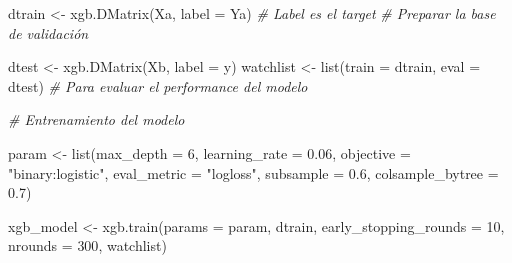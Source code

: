 \documentclass[
]{article}
\newenvironment{Shaded}{\begin{snugshade}}{\end{snugshade}}
\newcommand{\AttributeTok}[1]{\textcolor[rgb]{0.77,0.63,0.00}{#1}}
\newcommand{\CommentTok}[1]{\textcolor[rgb]{0.56,0.35,0.01}{\textit{#1}}}
\newcommand{\DecValTok}[1]{\textcolor[rgb]{0.00,0.00,0.81}{#1}}
\newcommand{\FloatTok}[1]{\textcolor[rgb]{0.00,0.00,0.81}{#1}}
\newcommand{\FunctionTok}[1]{\textcolor[rgb]{0.00,0.00,0.00}{#1}}
\newcommand{\NormalTok}[1]{#1}
\newcommand{\OtherTok}[1]{\textcolor[rgb]{0.56,0.35,0.01}{#1}}
\newcommand{\StringTok}[1]{\textcolor[rgb]{0.31,0.60,0.02}{#1}}
\begin{document}
\begin{Shaded}
\begin{Highlighting}[]
\NormalTok{dtrain }\OtherTok{\textless{}{-}} \FunctionTok{xgb.DMatrix}\NormalTok{(Xa, }\AttributeTok{label =}\NormalTok{ Ya) }
\CommentTok{\# Label es el target}
\CommentTok{\# Preparar la base de validación}

\NormalTok{dtest }\OtherTok{\textless{}{-}} \FunctionTok{xgb.DMatrix}\NormalTok{(Xb, }\AttributeTok{label =}\NormalTok{ y)}
\NormalTok{watchlist }\OtherTok{\textless{}{-}} \FunctionTok{list}\NormalTok{(}\AttributeTok{train =}\NormalTok{ dtrain, }\AttributeTok{eval =}\NormalTok{ dtest) }
\CommentTok{\# Para evaluar el performance del modelo}


\CommentTok{\# Entrenamiento del modelo}

\NormalTok{param }\OtherTok{\textless{}{-}} \FunctionTok{list}\NormalTok{(}\AttributeTok{max\_depth =} \DecValTok{6}\NormalTok{, }\AttributeTok{learning\_rate =} \FloatTok{0.06}\NormalTok{, }
              \AttributeTok{objective =} \StringTok{"binary:logistic"}\NormalTok{,}
              \AttributeTok{eval\_metric =} \StringTok{"logloss"}\NormalTok{, }\AttributeTok{subsample =} \FloatTok{0.6}\NormalTok{, }\AttributeTok{colsample\_bytree =} \FloatTok{0.7}\NormalTok{)}


\NormalTok{xgb\_model }\OtherTok{\textless{}{-}} \FunctionTok{xgb.train}\NormalTok{(}\AttributeTok{params =}\NormalTok{ param, dtrain, }
                       \AttributeTok{early\_stopping\_rounds =}  \DecValTok{10}\NormalTok{, }
                       \AttributeTok{nrounds =} \DecValTok{300}\NormalTok{,}
\NormalTok{                 watchlist)}
\end{Highlighting}
\end{Shaded}
\end{document}
